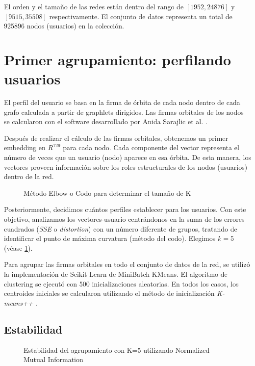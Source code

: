 El orden y el tamaño de las redes están dentro del rango de $[1952,24876]$ y $[9515,35508]$ respectivamente. El conjunto de datos representa un total de 925896 nodos (usuarios) en la colección.

\section{Primer agrupamiento: perfilando usuarios}

El perfil del usuario se basa en la firma de órbita de cada nodo dentro de cada grafo calculada a partir de graphlets dirigidos. Las firmas orbitales de los nodos se calcularon con el software desarrollado por Anida Sarajlic et al. \cite{sarajlic_graphlet-based_2016}. 

Después de realizar el cálculo de las firmas orbitales, obtenemos un primer embedding en ${R}^{129}$ para cada nodo. Cada componente del vector representa el número de veces que un usuario (nodo) aparece en esa órbita. De esta manera, los vectores proveen información sobre los roles estructurales de los nodos (usuarios) dentro de la red.

 \begin{figure}[htbp]
   \centering
   
    \caption{Método Elbow o Codo para determinar el tamaño de K}
    \label{fig:elbowmethod}
\end{figure}

Posteriormente, decidimos cuántos perfiles establecer para los usuarios. Con este objetivo, analizamos los vectores-usuario centrándonos en la suma de los errores cuadrados (\textit{SSE} o \textit{distortion}) con un número diferente de grupos, tratando de identificar el punto de máxima curvatura (método del codo). Elegimos $k = 5$ (véase \ref{fig:elbowmethod}).

Para agrupar las firmas orbitales en todo el conjunto de datos de la red, se utilizó la implementación de Scikit-Learn de MiniBatch KMeans. El algoritmo de clustering se ejecutó con 500 inicializaciones aleatorias. En todos los casos, los centroides iniciales se calcularon utilizando el método de inicialización \textit{K-means++} \cite{arthur_k-means_nodate}. 

\subsection{Estabilidad}

 \begin{figure}[htbp]
   \centering
   
    \caption{Estabilidad del agrupamiento con K=5 utilizando Normalized Mutual Information}
    \label{fig:estability-NMI}
\end{figure}

